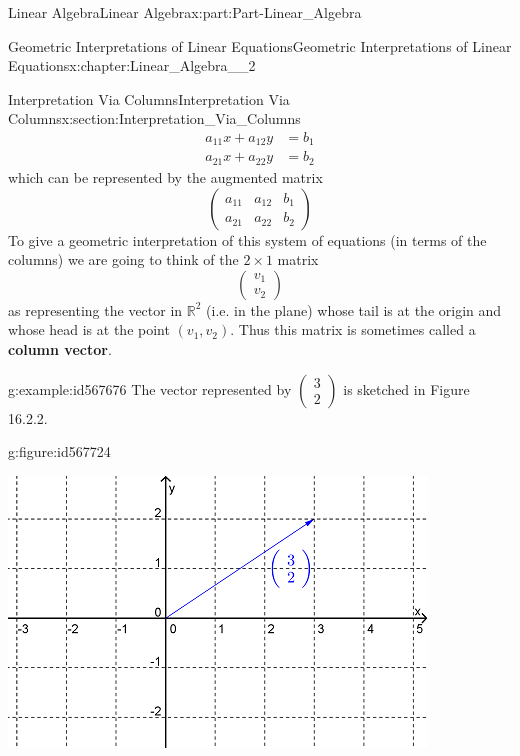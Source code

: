 \documentclass[oneside,10pt,]{book}
\newcommand{\terminology}[1]{\textbf{#1}}
\numberwithin{equation}{section}
\newcommand{\amp}{&}
\begin{document}
\begin{partptx}{Linear Algebra}{}{Linear Algebra}{}{}{x:part:Part-Linear_Algebra}
\begin{chapterptx}{Geometric Interpretations of Linear Equations}{}{Geometric Interpretations of Linear Equations}{}{}{x:chapter:Linear_Algebra__2}
\begin{sectionptx}{Interpretation Via Columns}{}{Interpretation Via Columns}{}{}{x:section:Interpretation_Via_Columns}
\begin{align*}
a_{11}x+a_{12}y \amp =b_1 \\
a_{21}x+a_{22}y \amp =b_2 
\end{align*}
which can be represented by the augmented matrix%
\begin{equation*}
\begin{pmatrix} a_{11} \amp a_{12} \amp b_1 \\ a_{21} \amp a_{22} \amp b_2 \end{pmatrix}
\end{equation*}
To give a geometric interpretation of this system of equations (in terms of the columns) we are going to think of the \(2\times 1\) matrix%
\begin{equation*}
\begin{pmatrix} v_{1} \\ v_{2} \end{pmatrix}
\end{equation*}
as representing the vector in \(\mathbb{R}^2\) (i.e. in the plane) whose tail is at the origin and whose head is at the point \((v_1,v_2)\). Thus this matrix is sometimes called a \terminology{column vector}.%
\begin{example}{}{g:example:id567676}%
The vector represented by \(\begin{pmatrix} 3 \\ 2 \end{pmatrix} \) is sketched in Figure 16.2.2. \begin{figureptx}{}{g:figure:id567724}{}%
\begin{image}{0.2}{0.6}{0.2}%
\includegraphics[width=\linewidth]{./LinearAlgebra/Images/2/figure3.png}
\end{image}%
\tcblower

\end{figureptx}
\end{example}
\end{sectionptx}
\end{chapterptx}
\end{partptx}
\end{document}
